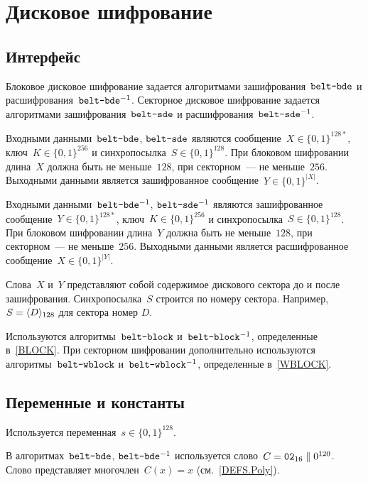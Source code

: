 \section{Дисковое шифрование}\label{DSK}

\subsection{Интерфейс}\label{DSK.IFace}

Блоковое дисковое шифрование задается алгоритмами 
зашифрования~$\texttt{belt-bde}$ и расшифрования~$\texttt{belt-bde}^{-1}$.
%
Секторное дисковое шифрование задается алгоритмами 
зашифрования~$\texttt{belt-sde}$ и расшифрования~$\texttt{belt-sde}^{-1}$.

Входными данными~$\texttt{belt-bde}$, $\texttt{belt-sde}$ являются 
сообщение~$X\in\{0,1\}^{128*}$, ключ~$K\in\{0,1\}^{256}$ и 
синхропосылка~$S\in\{0,1\}^{128}$. 
%
При блоковом шифровании длина~$X$ должна быть не меньше~$128$, при 
секторном~--- не меньше~$256$.
%
Выходными данными является зашифрованное сообщение~$Y\in\{0,1\}^{|X|}$.

Входными данными~$\texttt{belt-bde}^{-1}$, $\texttt{belt-sde}^{-1}$ являются 
зашифрованное сообщение~$Y\in\{0,1\}^{128*}$, ключ~$K\in\{0,1\}^{256}$ и 
синхропосылка~$S\in\{0,1\}^{128}$. 
%
При блоковом шифровании длина~$Y$ должна быть не меньше~$128$, при 
секторном~--- не меньше~$256$.
%
Выходными данными является расшифрованное сообщение~$X\in\{0,1\}^{|Y|}$.

Слова~$X$ и~$Y$ представляют собой содержимое дискового сектора до и после
зашифрования. Синхропосылка~$S$ строится по номеру сектора.
Например, $S=\langle D\rangle_{128}$ для сектора номер $D$.

Используются алгоритмы~$\texttt{belt-block}$ и~$\texttt{belt-block}^{-1}$, 
определенные в~\ref{BLOCK}. 
%
При секторном шифровании дополнительно используются 
алгоритмы~$\texttt{belt-wblock}$ и~$\texttt{belt-wblock}^{-1}$, 
определенные в~\ref{WBLOCK}.  

\subsection{Переменные и константы}\label{DSK.Vars}

Используется переменная~$s\in\{0,1\}^{128}$. 

В алгоритмах~$\texttt{belt-bde}$, $\texttt{belt-bde}^{-1}$ 
используется слово~$C=\texttt{02}_{16}\parallel 0^{120}$.
Слово представляет многочлен~$C(x)=x$ (см.~\ref{DEFS.Poly}).


